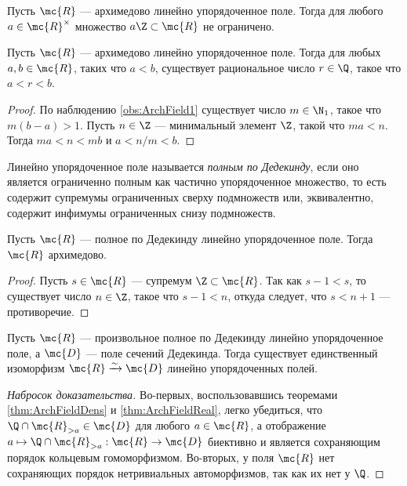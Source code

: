 \documentclass[
	extrafontsizes,
	11pt,
	hyphens,
]{memoir}
\begin{document}
\begin{observation}
\label{obs:ArchField1}
Пусть \(\mc{R}\) --- архимедово линейно упорядоченное поле.
Тогда для любого \(a \in \mc{R}^\times\) множество \(a \Z \subset \mc{R}\) не ограничено.
\end{observation}

\begin{theorem}
\label{thm:ArchFieldDens}
Пусть \(\mc{R}\) --- архимедово линейно упорядоченное поле.
Тогда для любых \(a, b \in \mc{R}\), таких что \(a < b\), существует рациональное число \(r \in \Q\), такое что \(a < r < b\).
\end{theorem}

\begin{proof}
По наблюдению \ref{obs:ArchField1} существует число \(m \in \N_1\), такое что \(m(b-a) > 1\). Пусть \(n \in \Z\) --- минимальный элемент \(\Z\), такой что \(ma < n\). Тогда \(ma < n < mb\) и \(a < n/m < b\).
\end{proof}

\begin{definition}
Линейно упорядоченное поле называется \emph{полным по Дедекинду}, если оно является ограниченно полным как частично упорядоченное множество, то есть содержит
супремумы ограниченных сверху подмножеств или, эквивалентно, содержит инфимумы ограниченных снизу подмножеств.
\end{definition}

\begin{theorem}
\label{thm:ArchFieldReal}
Пусть \(\mc{R}\) --- полное по Дедекинду линейно упорядоченное поле.
Тогда \(\mc{R}\) архимедово.
\end{theorem}

\begin{proof}
Пусть \(s \in \mc{R}\) --- супремум \(\Z \subset \mc{R}\).
Так как \(s - 1 < s\), то существует число \(n \in \Z\), такое что \(s - 1 < n\), откуда следует, что \(s < n + 1\) --- противоречие.
\end{proof}

\begin{theorem}
Пусть \(\mc{R}\) --- произвольное полное по Дедекинду линейно упорядоченное поле,
а \(\mc{D}\) --- поле сечений Дедекинда.
Тогда существует единственный изоморфизм \(\mc{R} \xrightarrow{\sim} \mc{D}\) линейно упорядоченных полей.
\end{theorem}

\begin{proof}[Набросок доказательства]
Во-первых, воспользовавшись теоремами \ref{thm:ArchFieldDens} и \ref{thm:ArchFieldReal}, легко убедиться, что \(\Q \cap \mc{R}_{> a} \in \mc{D}\) для любого \(a \in \mc{R}\), а отображение \(a \mapsto \Q \cap \mc{R}_{> a} : \mc{R} \to \mc{D}\) биективно и является сохраняющим порядок кольцевым гомоморфизмом.
Во-вторых, у поля \(\mc{R}\) нет сохраняющих порядок нетривиальных автоморфизмов, так как их нет у \(\Q\).
\end{proof}
\end{document}
